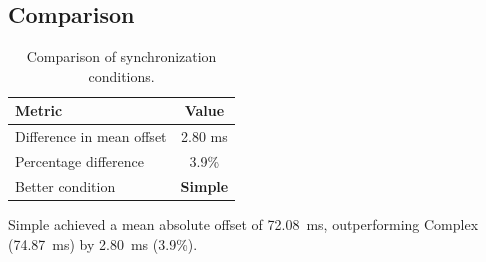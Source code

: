 \subsection*{Comparison}

\begin{table}[h!]
\centering
\begin{tabular}{|l|c|}
\hline
Metric & Value \\
\hline
Difference in mean offset & 2.80 ms \\
Percentage difference & 3.9\% \\
Better condition & \textbf{Simple} \\
\hline
\end{tabular}
\caption{Comparison of synchronization conditions.}
\label{tab:sync_comparison}
\end{table}

Simple achieved a mean absolute offset of 72.08~ms, outperforming Complex (74.87~ms) by 2.80~ms (3.9\%).
